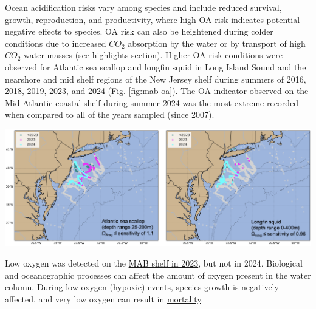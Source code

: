 \documentclass[
  10pt,
]{article}
\let\origfigure\figure
\let\endorigfigure\endfigure
\renewenvironment{figure}[1][2] {
    \expandafter\origfigure\expandafter[H]
} {
    \endorigfigure
}
\begin{document}
\href{https://noaa-edab.github.io/catalog/ocean_acidification.html}{Ocean acidification} risks vary among species and include reduced survival, growth, reproduction, and productivity, where high OA risk indicates potential negative effects to species. OA risk can also be heightened during colder conditions due to increased \(CO_2\) absorption by the water or by transport of high \(CO_2\) water masses (see \hyperref[highlights]{highlights section}). Higher OA risk conditions were observed for Atlantic sea scallop and longfin squid in Long Island Sound and the nearshore and mid shelf regions of the New Jersey shelf during summers of 2016, 2018, 2019, 2023, and 2024 (Fig. \ref{fig:mab-oa}). The OA indicator observed on the Mid-Atlantic coastal shelf during summer 2024 was the most extreme recorded when compared to all of the years sampled (since 2007).

\begin{figure}

{\centering \includegraphics[width=1\linewidth]{midatlantic_files/figure-latex/mab-oa-1} 

}

\caption{Locations where bottom aragonite saturation state ($\Omega_{Arag}$; summer only: June-August) were at or below the laboratory-derived sensitivity level for Atlantic sea scallop (left panel) and longfin squid (right panel) for the time periods 2007-2022 (dark cyan), 2023 only (magenta) and 2024 only (cyan). Gray circles indicate locations where bottom $\Omega_{Arag}$ values were above the species specific sensitivity values..}\label{fig:mab-oa}
\end{figure}

Low oxygen was detected on the \href{https://noaa-edab.github.io/catalog/observation_synthesis_2023.html}{MAB shelf in 2023}, but not in 2024. Biological and oceanographic processes can affect the amount of oxygen present in the water column. During low oxygen (hypoxic) events, species growth is negatively affected, and very low oxygen can result in \href{https://sebsnjaesnews.rutgers.edu/2023/12/rutgers-scientists-observe-unusual-ocean-conditions-possibly-linked-to-mortality-in-marine-life-off-new-jersey/}{mortality}.
\end{document}
